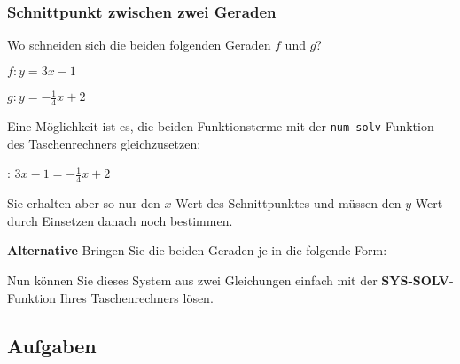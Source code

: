 \subsubsection{Schnittpunkt zwischen zwei Geraden}

Wo schneiden sich die beiden folgenden Geraden $f$ und $g$?

$f: y=3x - 1$

$g: y=-\frac14x +2$

Eine Möglichkeit ist es, die beiden Funktionsterme mit
der \texttt{num-solv}-Funktion des Taschenrechners gleichzusetzen:

: $3x-1 = -\frac14x+2$

Sie erhalten aber so nur den $x$-Wert des Schnittpunktes und müssen
den $y$-Wert durch Einsetzen danach noch bestimmen.


\textbf{Alternative}
Bringen Sie die beiden Geraden je in die folgende Form:


Nun können Sie dieses System aus zwei Gleichungen einfach mit
der \textbf{SYS-SOLV}-Funktion Ihres Taschenrechners lösen.

\vspace{5mm}


\vspace{5mm}

\newpage

\subsection*{Aufgaben}

\newpage
